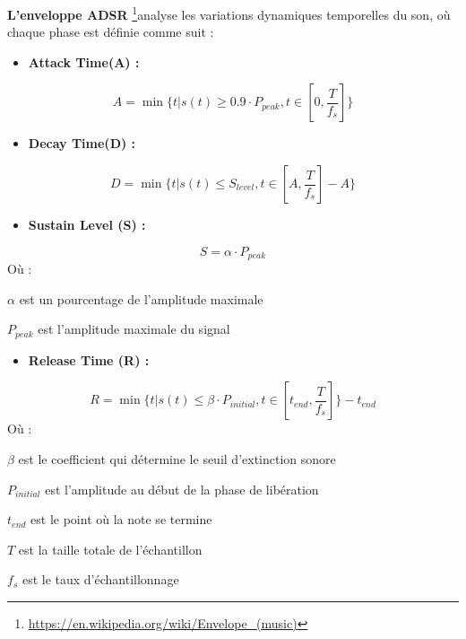 \textbf{L'enveloppe ADSR }\footnote{\href{https://en.wikipedia.org/wiki/Envelope_(music)}{https://en.wikipedia.org/wiki/Envelope\_(music)}}analyse les variations dynamiques temporelles du son, où chaque phase est définie comme suit :
\begin{itemize}
    \item \textbf{Attack Time(A) :}
\end{itemize}
\begin{equation}
    A = \min \{t|s(t)\geq0.9 \cdot P_{peak}, t\in [0, \frac{T}{f_s}]\}
\end{equation}
\begin{itemize}
    \item \textbf{Decay Time(D) :}
\end{itemize}
\begin{equation}
    D = \min \{t|s(t)\leq S_{level}, t\in [A, \frac{T}{f_s}] - A\}
\end{equation}
\begin{itemize}
    \item \textbf{Sustain Level (S) :}
\end{itemize}
\begin{equation}
    S = \alpha \cdot P_{peak}
\end{equation}
Où :
\begin{description}
    \item \(\alpha\) est un pourcentage de l'amplitude maximale
    \item \(P_{peak}\) est l'amplitude maximale du signal
\end{description}
\begin{itemize}
    \item \textbf{Release Time (R) :}
\end{itemize}
\begin{equation}
    R = \min \{t |s(t) \leq \beta \cdot P_{initial}, t \in [t_{end}, \frac{T}{f_s}]  \} - t_{end}
\end{equation}
Où :
\begin{description}
    \item \(\beta\) est le coefficient qui détermine le seuil d'extinction sonore
    \item \(P_{initial}\) est l'amplitude au début de la phase de libération
    \item \(t_{end}\) est le point où la note se termine
    \item \(T\) est la taille totale de l'échantillon
    \item \(f_s\) est le taux d'échantillonnage
\end{description}

